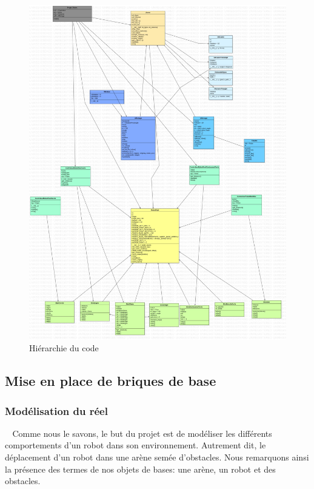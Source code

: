 \documentclass[12pt]{article}
\def\tab{$\>\>\>\>$}
\begin{document}
\begin{figure}[!h]
  \centering
    \includegraphics[width=0.8\paperwidth]{Images/ProjetRobotique4.jpg}
  \caption{Hiérarchie du code}
  \label{img:Images/ProjetRobotique4.jpg}
\end{figure}

\newpage
\subsection{Mise en place de briques de base}
\subsubsection{Modélisation du réel}
\tab Comme nous le savons, le but du projet est de modéliser les différents comportements d’un robot dans son environnement. Autrement dit, le déplacement d’un robot dans une arène semée d’obstacles. Nous remarquons ainsi la présence des termes de nos objets de bases: une arène, un robot et des obstacles.
\end{document}
